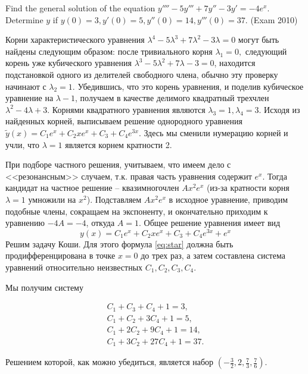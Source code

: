 \begin{problem}
Find the general solution of the equation $y''''-5y'''+7y''-3y'=-4e^{x} $. Determine $y$ if $y(0)=3, y'(0)=5, y''(0)=14, y'''(0)=37.$ (Exam 2010)


\begin{sol}
Корни характеристического уравнения $\lambda ^{4} -5\lambda ^{3} +7\lambda ^{2} -3\lambda =0$ могут быть найдены следующим образом: после тривиального корня $\lambda _{1} =0, $ следующий корень уже кубического уравнения $\lambda ^{3} -5\lambda ^{2} +7\lambda -3=0$, находится подстановкой одного из делителей свободного члена, обычно эту проверку начинают с $\lambda _{2} =1$. Убедившись, что это корень уравнения, и поделив кубическое уравнение на $\lambda -1$, получаем в качестве делимого квадратный трехчлен $\lambda ^{2} -4\lambda +3$. Корнями квадратного уравнения являются $\lambda _{3} =1, \lambda _{4} =3$. Исходя из найденных корней, выписываем решение однородного уравнения $\tilde{y}(x)=C_{1} e^{x} +C_{2} xe^{x} +C_{3} +C_{4} e^{3x} $. Здесь мы сменили нумерацию корней и учли, что $\lambda =1$ является корнем кратности 2.

При подборе частного решения, учитываем, что имеем дело с <<резонансным>> случаем, т.к. правая часть уравнения  содержит $e^{x} $. Тогда кандидат на частное решение -- квазимногочлен $Ax^{2} e^{x} $ (из-за кратности корня $\lambda =1$ умножили на $x^{2} $). Подставляем $Ax^{2} e^{x} $ в исходное уравнение, приводим подобные члены, сокращаем на экспоненту, и окончательно приходим к уравнению $-4A=-4$, откуда $A=1$. Общее решение уравнения  имеет вид
\begin{equation} \label{eq:star}
y(x)=C_{1} e^{x} +C_{2} xe^{x} +C_{3} +C_{4} e^{3x} +e^{x}
\end{equation}
Решим задачу Коши. Для этого формула \ref{eq:star} должна быть продифференцирована в точке $x=0$ до трех раз, а затем составлена система уравнений относительно неизвестных $C_{1} , C_{2} , C_{3} , C_{4} $.

Мы получим систему

\[\begin{array}{c} {C_{1} +C_{3} +C_{4} +1=3,} \\ {C_{1} +C_{2} +3C_{4} +1=5,} \\ {C_{1} +2C_{2} +9C_{4} +1=14,} \\ {C_{1} +3C_{2} +27C_{4} +1=37.} \end{array}\]

Решением которой, как можно убедиться, является набор $\left(-\frac{3}{2} ,2,\frac{7}{3} ,\frac{7}{6} \right)$.
\end{sol}
\end{problem}

